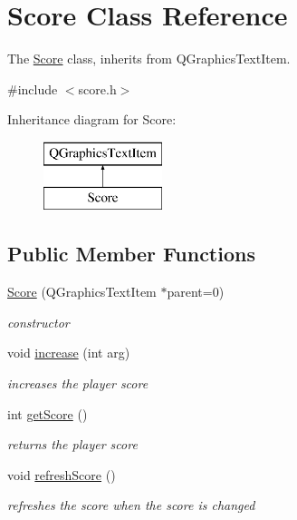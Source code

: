 \hypertarget{classScore}{}\section{Score Class Reference}
\label{classScore}


The \hyperlink{classScore}{Score} class, inherits from Q\+Graphics\+Text\+Item.  




{\ttfamily \#include $<$score.\+h$>$}

Inheritance diagram for Score\+:\begin{figure}[H]
\begin{center}
\leavevmode
\includegraphics[height=2.000000cm]{classScore}
\end{center}
\end{figure}
\subsection*{Public Member Functions}
\begin{DoxyCompactItemize}
\item 
\mbox{\label{classScore_aa80a5a37ab48264a8862849c9d72b740}} 
\hyperlink{classScore_aa80a5a37ab48264a8862849c9d72b740}{Score} (Q\+Graphics\+Text\+Item $\ast$parent=0)
\begin{DoxyCompactList}\small\item\em constructor \end{DoxyCompactList}\item 
\mbox{\label{classScore_a9a580e858558c0a02cfbd21a19e0a6e2}} 
void \hyperlink{classScore_a9a580e858558c0a02cfbd21a19e0a6e2}{increase} (int arg)
\begin{DoxyCompactList}\small\item\em increases the player score \end{DoxyCompactList}\item 
\mbox{\label{classScore_a8627c93270c188a3fd28a25b1d07a9e7}} 
int \hyperlink{classScore_a8627c93270c188a3fd28a25b1d07a9e7}{get\+Score} ()
\begin{DoxyCompactList}\small\item\em returns the player score \end{DoxyCompactList}\item 
\mbox{\label{classScore_a2770723408a4db5cdf42b17528bcd460}} 
void \hyperlink{classScore_a2770723408a4db5cdf42b17528bcd460}{refresh\+Score} ()
\begin{DoxyCompactList}\small\item\em refreshes the score when the score is changed \end{DoxyCompactList}\end{DoxyCompactItemize}


